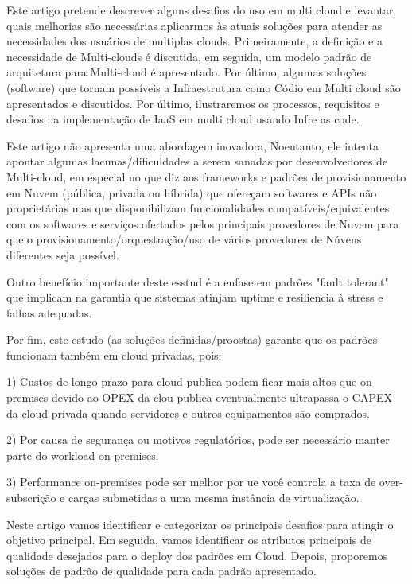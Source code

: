 \documentclass[12pt]{article}
\begin{document}
	    Este artigo pretende descrever alguns desafios do uso em multi cloud e levantar quais melhorias são necessárias aplicarmos às atuais soluções para atender as necessidades dos usuários de multiplas clouds. Primeiramente, a definição e a necessidade de Multi-clouds é discutida, em seguida, um modelo padrão de arquitetura para Multi-cloud é apresentado. Por último, algumas soluções (software) que tornam possíveis a Infraestrutura como Códio em Multi cloud são apresentados e discutidos. Por último, ilustraremos os processos, requisitos e desafios na implementação de IaaS em multi cloud usando Infre as code.
	    
	    Este artigo não apresenta uma abordagem inovadora, Noentanto, ele intenta apontar algumas lacunas/dificuldades a serem sanadas por desenvolvedores de Multi-cloud, em especial no que diz aos frameworks e padrões de provisionamento em Nuvem (pública, privada ou híbrida) que ofereçam softwares e APIs não proprietárias mas que disponibilizam funcionalidades compatíveis/equivalentes com os softwares e serviços ofertados pelos principais provedores de Nuvem para que o provisionamento/orquestração/uso de vários provedores de Núvens diferentes seja possível.
		
		
		
		
		
		
		Outro benefício importante deste esstud é a enfase em padrões "fault tolerant" que implicam na garantia que sistemas atinjam uptime e resiliencia à stress e falhas adequadas. 
		
		Por fim, este estudo (as soluções definidas/proostas) garante que os padrões funcionam também em cloud privadas, pois:
		
		1) Custos de longo prazo para cloud publica podem ficar mais altos que on-premises devido ao OPEX da clou publica eventualmente ultrapassa o CAPEX da cloud privada quando servidores e outros equipamentos são comprados.
		
		2) Por causa de segurança ou motivos regulatórios, pode ser necessário manter parte do workload on-premises.
		
		3) Performance on-premises pode ser melhor por ue você controla a taxa de over-subscrição e cargas submetidas a uma mesma instância de virtualização.
		
		Neste artigo vamos identificar e categorizar os principais desafios para atingir o objetivo principal. Em seguida, vamos identificar os atributos principais de qualidade desejados para o deploy dos padrões em Cloud. Depois, proporemos soluções de padrão de qualidade para cada padrão apresentado. 
		
\end{document}
